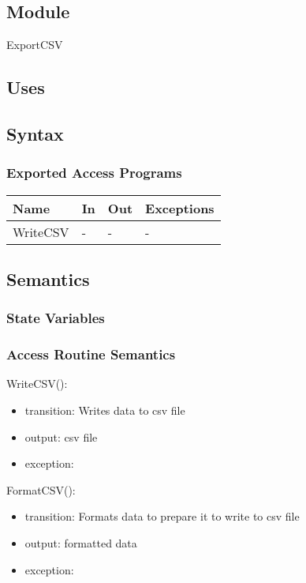 \documentclass[12pt, titlepage]{article}
\begin{document}
\subsection{Module}

ExportCSV

\subsection{Uses}


\subsection{Syntax}

\subsubsection{Exported Access Programs}

\begin{center}
\begin{tabular}{p{2cm} p{4cm} p{4cm} p{2cm}}
\hline
\textbf{Name} & \textbf{In} & \textbf{Out} & \textbf{Exceptions} \\
\hline
WriteCSV & - & - & - \\
\hline
\end{tabular}
\end{center}

\subsection{Semantics}

\subsubsection{State Variables}


\subsubsection{Access Routine Semantics}

\noindent WriteCSV():
\begin{itemize}
\item transition: Writes data to csv file 
\item output: csv file
\item exception:
\end{itemize}

\noindent FormatCSV():
\begin{itemize}
\item transition: Formats data to prepare it to write to csv file 
\item output: formatted data
\item exception:
\end{itemize}
\end{document}
